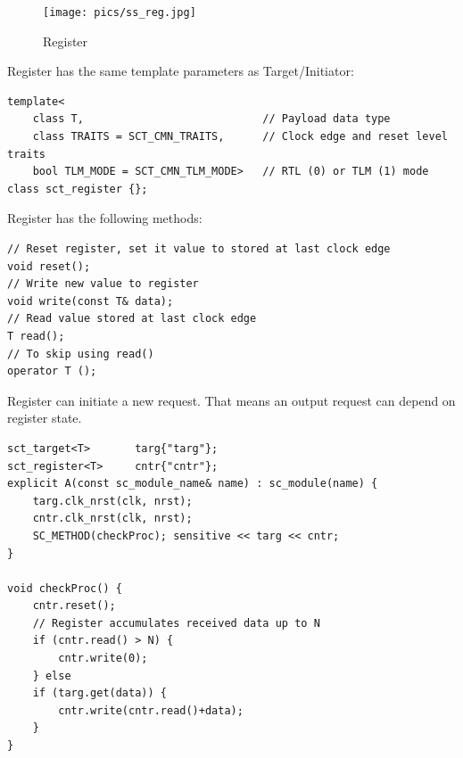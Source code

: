 \begin{figure}[!htb]
\centering
\texttt{[image: pics/ss\_reg.jpg]}
\caption{Register}
\label{fig:ss_reg}
\end{figure}

Register has the same template parameters as Target/Initiator:
\begin{lstlisting}[style=mycpp]
template<
    class T,                            // Payload data type 
    class TRAITS = SCT_CMN_TRAITS,      // Clock edge and reset level traits
    bool TLM_MODE = SCT_CMN_TLM_MODE>   // RTL (0) or TLM (1) mode
class sct_register {};
\end{lstlisting}

Register has the following methods:

\begin{lstlisting}[style=mycpp]
// Reset register, set it value to stored at last clock edge
void reset();
// Write new value to register
void write(const T& data);
// Read value stored at last clock edge
T read();
// To skip using read()
operator T ();
\end{lstlisting}

Register can initiate a new request. That means an output request can depend on register state.

\begin{lstlisting}[style=mycpp]
sct_target<T>       targ{"targ"};
sct_register<T>     cntr{"cntr"};
explicit A(const sc_module_name& name) : sc_module(name) {
    targ.clk_nrst(clk, nrst);
    cntr.clk_nrst(clk, nrst);
    SC_METHOD(checkProc); sensitive << targ << cntr;
}

void checkProc() {
    cntr.reset();
    // Register accumulates received data up to N
    if (cntr.read() > N) {
        cntr.write(0); 
    } else 
    if (targ.get(data)) {
        cntr.write(cntr.read()+data); 
    }
}
\end{lstlisting}


